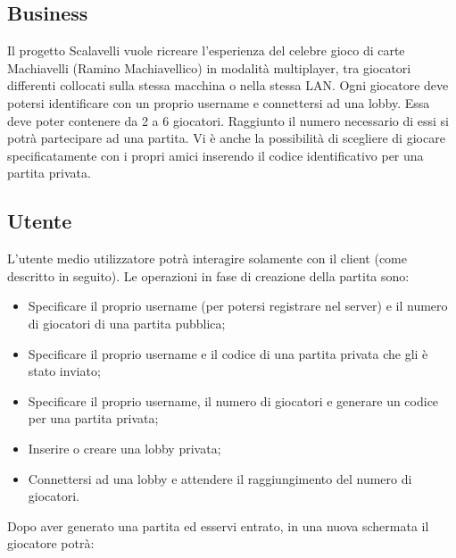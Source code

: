 \subsection{Business}
Il progetto Scalavelli vuole ricreare l’esperienza del celebre gioco di carte Machiavelli (Ramino Machiavellico) in modalità multiplayer, tra giocatori differenti collocati sulla stessa macchina o nella stessa LAN. Ogni giocatore deve potersi identificare con un proprio username e connettersi ad una lobby.
Essa deve poter contenere da 2 a 6 giocatori.
Raggiunto il numero necessario di essi si potrà partecipare ad una partita.
Vi è anche la possibilità di scegliere di giocare specificatamente con i propri amici inserendo il codice identificativo per una partita privata.

\subsection{Utente}
L’utente medio utilizzatore potrà interagire solamente con il client (come descritto in seguito).
Le operazioni in fase di creazione della partita sono:
\begin{itemize}
    \item Specificare il proprio username (per potersi registrare nel server) e il numero di giocatori di una partita pubblica;
    \item Specificare il proprio username e il codice di una partita privata che gli è stato inviato;
    \item Specificare il proprio username, il numero di giocatori e generare un codice per una partita privata;
    \item Inserire o creare una lobby privata;
    \item Connettersi ad una lobby e attendere il raggiungimento del numero di giocatori.
\end{itemize}
Dopo aver generato una partita ed esservi entrato, in una nuova schermata il giocatore potrà:
